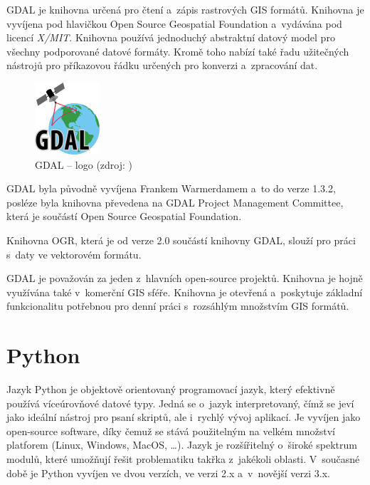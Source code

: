 \documentclass[a4paper,12pt,oneside]{book}
\begin{document}
GDAL je knihovna určená pro čtení a~zápis rastrových GIS
formátů. Knihovna je vyvíjena pod hlavičkou Open Source Geospatial
Foundation a~vydávána pod licencí \textit{X/MIT}. Knihovna používá
jednoduchý abstraktní datový model pro všechny podporované datové
formáty. Kromě toho nabízí také řadu užitečných nástrojů pro
příkazovou řádku určených pro konverzi a~zpracování
dat.

\begin{figure}[h]
\centering
\includegraphics[scale=1]{images/gdal-logo.png}
\caption[GDAL -- logo]{GDAL -- logo (zdroj: \cite{gdal})}
\end{figure}

GDAL byla původně vyvíjena Frankem Warmerdamem a~to do verze 1.3.2,
posléze byla knihovna převedena na GDAL Project Management Committee,
která je součástí Open Source Geospatial Foundation.

Knihovna OGR, která je od verze 2.0 součástí knihovny GDAL, slouží pro
práci s~daty ve vektorovém formátu.

GDAL je považován za jeden z~hlavních open-source projektů. Knihovna
je hojně využívána také v~komerční GIS sféře. Knihovna je otevřená
a~poskytuje základní funkcionalitu potřebnou pro denní práci
s~rozsáhlým množstvím GIS formátů.\cite{gdal_wiki} \cite{gdal}


\section{Python}

Jazyk Python je objektově orientovaný programovací jazyk, který
efektivně používá víceúrovňové datové typy. Jedná se o~jazyk
interpretovaný, čímž se jeví jako ideální nástroj pro psaní skriptů,
ale i~rychlý vývoj aplikací. Je vyvíjen jako open-source software,
díky čemuž se stává použitelným na velkém množství platforem (Linux,
Windows, MacOS, \dots). Jazyk je rozšířitelný o~široké spektrum
modulů, které umožňují řešit problematiku takřka z~jakékoli
oblasti. V~současné době je Python vyvíjen ve dvou verzích, ve verzi
2.x a~v~novější verzi 3.x.  \cite{dive_into_python} \cite{python_web}
\end{document}
